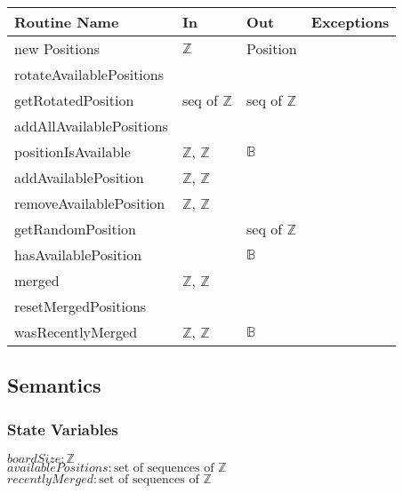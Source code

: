 \documentclass[12pt]{article}
\begin{document}
\begin{tabular}{|l|l|l|p{5cm}|}
\hline
\textbf{Routine Name}    & \textbf{In}                & \textbf{Out}        & \textbf{Exceptions} \\ \hline
new Positions            & $\mathbb{Z}$               & Position            &                     \\ \hline
rotateAvailablePositions &                            &                     &                     \\ \hline
getRotatedPosition       & seq of $\mathbb{Z}$        & seq of $\mathbb{Z}$ &                     \\ \hline
addAllAvailablePositions &                            &                     &                     \\ \hline
positionIsAvailable      & $\mathbb{Z}$, $\mathbb{Z}$ & $\mathbb{B}$        &                     \\ \hline
addAvailablePosition     & $\mathbb{Z}$, $\mathbb{Z}$ &                     &                     \\ \hline
removeAvailablePosition  & $\mathbb{Z}$, $\mathbb{Z}$ &                     &                     \\ \hline
getRandomPosition        &                            & seq of $\mathbb{Z}$ &                     \\ \hline
hasAvailablePosition     &                            & $\mathbb{B}$        &                     \\ \hline
merged                   & $\mathbb{Z}$, $\mathbb{Z}$ &                     &                     \\ \hline
resetMergedPositions     &                            &                     &                     \\ \hline
wasRecentlyMerged        & $\mathbb{Z}$, $\mathbb{Z}$ & $\mathbb{B}$        &                     \\ \hline
\end{tabular}

\subsection* {Semantics}

\subsubsection* {State Variables}

$boardSize: \mathbb{Z}$\\
$availablePositions: \text{set of sequences of } \mathbb{Z}$ \\
$recentlyMerged: \text{set of sequences of } \mathbb{Z}$
\end{document}
